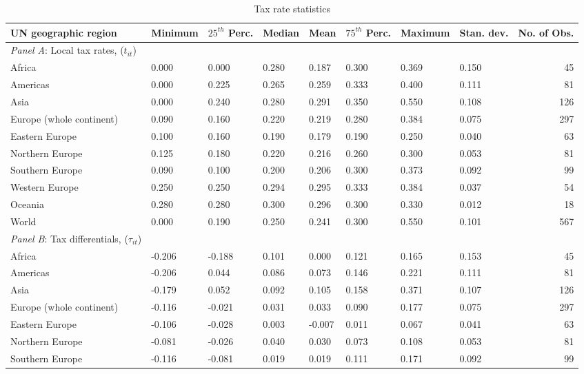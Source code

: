 \documentclass[10pt,twocolumn,oneside,cmyk]{article}
\begin{document}
\begin{table*}[t]
\footnotesize
 \begin{center}
  \caption{Tax rate statistics}\label{tab5}
   \begin{tabularx}{\textwidth}{l *{7}{Y} r}
    \toprule
    UN geographic region &Minimum &$25^{th}$ Perc. &Median &Mean &$75^{th}$ Perc. &Maximum &Stan. dev. &No. of Obs.\\
    \midrule
    \textit{Panel A}: Local tax rates, ($t_{it}$) \\
    \midrule
    Africa &0.000 &0.000 &0.280 &0.187 &0.300 &0.369 &0.150 &45\\
    Americas &0.000 &0.225 &0.265 &0.259 &0.333 &0.400 &0.111 &81\\
    Asia &0.000 &0.240 &0.280 &0.291 &0.350 &0.550 &0.108 &126\\
    Europe (whole continent) &0.090 &0.160 &0.220 &0.219 &0.280 &0.384 &0.075 &297\\
    Eastern Europe &0.100 &0.160 &0.190 &0.179 &0.190 &0.250 &0.040 &63\\
    Northern Europe &0.125 &0.180 &0.220 &0.216 &0.260 &0.300 &0.053 &81\\
    Southern Europe &0.090 &0.100 &0.200 &0.206 &0.300 &0.373 &0.092 &99\\
    Western Europe &0.250 &0.250 &0.294 &0.295 &0.333 &0.384 &0.037 &54\\
    Oceania &0.280 &0.280 &0.300 &0.296 &0.300 &0.330 &0.012 &18\\
    World &0.000 &0.190 &0.250 &0.241 &0.300 &0.550 &0.101 &567\\
    \midrule
    \textit{Panel B}: Tax differentials, ($\tau_{it}$)\\
    \midrule
    Africa &-0.206 &-0.188 &0.101 &0.000 &0.121 &0.165 &0.153 &45\\
    Americas &-0.206 &0.044 &0.086 &0.073 &0.146 &0.221 &0.111 &81\\
    Asia &-0.179 &0.052 &0.092 &0.105 &0.158 &0.371 &0.107 &126\\
    Europe (whole continent) &-0.116 &-0.021 &0.031 &0.033 &0.090 &0.177 &0.075 &297\\
    Eastern Europe &-0.106 &-0.028 &0.003 &-0.007 &0.011 &0.067 &0.041 &63\\
    Northern Europe &-0.081 &-0.026 &0.040 &0.030 &0.073 &0.108 &0.053 &81\\
    Southern Europe &-0.116 &-0.081 &0.019 &0.019 &0.111 &0.171 &0.092 &99\\

\end{tabularx}
\end{center}
\end{table*}
\end{document}
